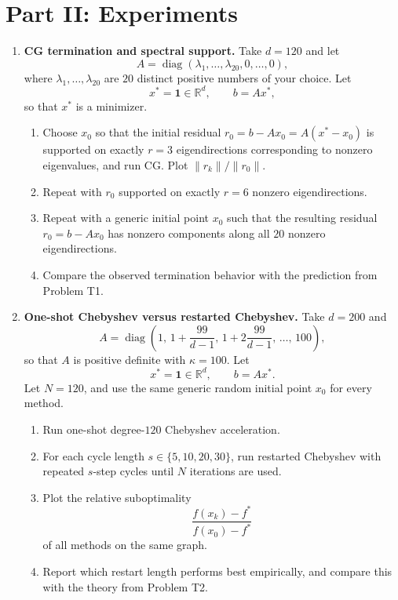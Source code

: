 \documentclass[11pt]{article}
\newcommand{\R}{\mathbb{R}}
\begin{document}
\section*{Part II: Experiments}

\begin{enumerate}[label=\textbf{E\arabic*.}, leftmargin=0pt, itemindent=2.5em]

\item \textbf{CG termination and spectral support.}
Take $d=120$ and let
\[
A=\operatorname{diag}(\lambda_1,\dots,\lambda_{20},0,\dots,0),
\]
where $\lambda_1,\dots,\lambda_{20}$ are $20$ distinct positive numbers of your choice. Let
\[
x^\ast=\mathbf{1}\in\R^d,\qquad b=Ax^\ast,
\]
so that $x^\ast$ is a minimizer.
\begin{enumerate}[label=(\alph*)]
\item Choose $x_0$ so that the initial residual $r_0=b-Ax_0=A(x^\ast-x_0)$ is supported on exactly $r=3$ eigendirections corresponding to nonzero eigenvalues, and run CG. Plot $\|r_k\|/\|r_0\|$.
\item Repeat with $r_0$ supported on exactly $r=6$ nonzero eigendirections.
\item Repeat with a generic initial point $x_0$ such that the resulting residual $r_0=b-Ax_0$ has nonzero components along all $20$ nonzero eigendirections.
\item Compare the observed termination behavior with the prediction from Problem T1.
\end{enumerate}

\item \textbf{One-shot Chebyshev versus restarted Chebyshev.}
Take $d=200$ and
\[
A=\operatorname{diag}\left(1,\,1+\frac{99}{d-1},\,1+2\frac{99}{d-1},\,\dots,\,100\right),
\]
so that $A$ is positive definite with $\kappa=100$. Let
\[
x^\ast=\mathbf{1}\in\R^d,\qquad b=Ax^\ast.
\]
Let $N=120$, and use the same generic random initial point $x_0$ for every method.
\begin{enumerate}[label=(\alph*)]
\item Run one-shot degree-$120$ Chebyshev acceleration.
\item For each cycle length $s\in\{5,10,20,30\}$, run restarted Chebyshev with repeated $s$-step cycles until $N$ iterations are used.
\item Plot the relative suboptimality
\[
\frac{f(x_k)-f^\ast}{f(x_0)-f^\ast}
\]
of all methods on the same graph.
\item Report which restart length performs best empirically, and compare this with the theory from Problem T2.
\end{enumerate}


\end{enumerate}
\end{document}
